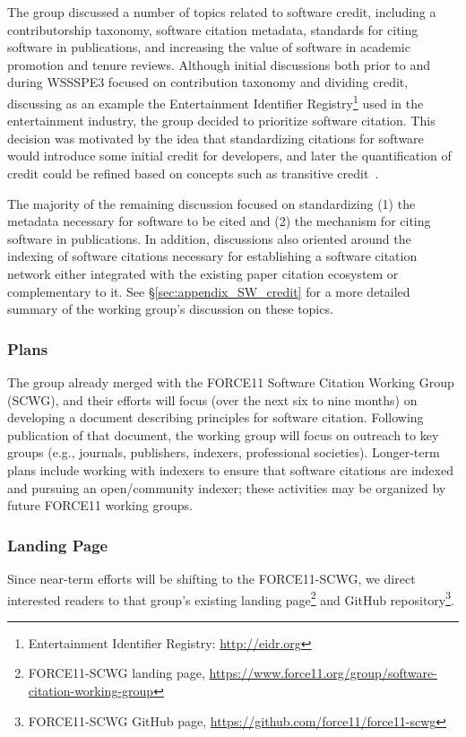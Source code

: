 The group discussed a number of topics related to software credit, including a contributorship taxonomy, software citation metadata, standards for citing software in publications, and increasing the value of software in academic promotion and tenure reviews.
Although initial discussions both prior to and during WSSSPE3 focused on contribution taxonomy and dividing credit, discussing as an example the Entertainment Identifier Registry\footnote{Entertainment Identifier Registry: \url{http://eidr.org}} used in the entertainment industry, the group decided to prioritize software citation.
This decision was motivated by the idea that standardizing citations for software would introduce some initial credit for developers, and later the quantification of credit could be refined based on concepts such as transitive credit~\cite{wssspe2_katz,Katz:2014_tc}.

The majority of the remaining discussion focused on standardizing (1) the metadata necessary for software to be cited and (2) the mechanism for citing software in publications.
In addition, discussions also oriented around the indexing of software citations necessary for establishing a software citation network either integrated with the existing paper citation ecosystem or complementary to it.
See \S\ref{sec:appendix_SW_credit} for a more detailed summary of the working group's discussion on these topics.

\subsubsection{Plans}

The group already merged with the FORCE11 Software Citation Working Group (SCWG), and their efforts will focus (over the next six to nine months) on developing a document describing principles for software citation.
Following publication of that document, the working group will focus on outreach to key groups (e.g., journals, publishers, indexers, professional societies).
Longer-term plans include working with indexers to ensure that software citations are indexed and pursuing an open\slash community indexer; these activities may be organized by future FORCE11 working groups.

\subsubsection{Landing Page}

Since near-term efforts will be shifting to the FORCE11-SCWG, we direct interested readers to that group's existing landing page\footnote{FORCE11-SCWG landing page, \url{https://www.force11.org/group/software-citation-working-group}} and GitHub repository\footnote{FORCE11-SCWG GitHub page,  \url{https://github.com/force11/force11-scwg}}.